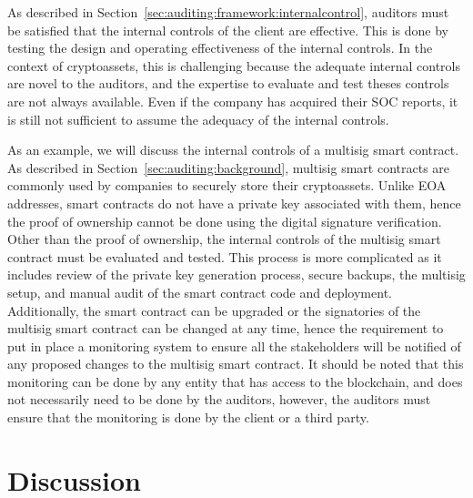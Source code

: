 As described in Section~\ref{sec:auditing:framework:internalcontrol}, auditors must be satisfied that the internal controls of the client are effective. This is done by testing the design and operating effectiveness of the internal controls. In the context of cryptoassets, this is challenging because the adequate internal controls are novel to the auditors, and the expertise to evaluate and test theses controls are not always available. Even if the company has acquired their SOC reports, it is still not sufficient to assume the adequacy of the internal controls.

As an example, we will discuss the internal controls of a multisig smart contract. As described in Section~\ref{sec:auditing:background}, multisig smart contracts are commonly used by companies to securely store their cryptoassets. Unlike EOA addresses, smart contracts do not have a private key associated with them, hence the proof of ownership cannot be done using the digital signature verification. Other than the proof of ownership, the internal controls of the multisig smart contract must be evaluated and tested. This process is more complicated as it includes review of the private key generation process, secure backups, the multisig setup, and manual audit of the smart contract code and deployment. Additionally, the smart contract can be upgraded or the signatories of the multisig smart contract can be changed at any time, hence the requirement to put in place a monitoring system to ensure all the stakeholders will be notified of any proposed changes to the multisig smart contract. It should be noted that this monitoring can be done by any entity that has access to the blockchain, and does not necessarily need to be done by the auditors, however, the auditors must ensure that the monitoring is done by the client or a third party.







\section{Discussion} \label{sec:auditing:discussion}

